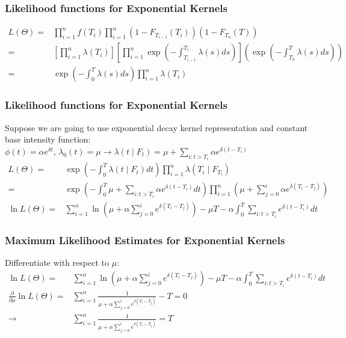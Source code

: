 \documentclass{beamer}
\begin{document}
\begin{frame}
\frametitle{Likelihood functions for Exponential Kernels}
\begin{equation*}
\begin{split}
L(\Theta) = &\prod_{i=1}^n f(T_{i}) \prod_{i=1}^n (1-F_{T_{i-1}}(T_i)) (1-F_{T_{n}}(T))\\
= &[\prod_{i=1}^n \lambda(T_{i})] [\prod_{i=1}^n \exp(-\int_{T_{i-1}}^{T_i} \lambda(s) ds)] (\exp(-\int_{T_{n}}^{T} \lambda(s) ds))\\
= &\exp(-\int_{0}^{T} \lambda(s) ds) \prod_{i=1}^n \lambda(T_{i})
\end{split}
\end{equation*}
\end{frame}

\begin{frame}
\frametitle{Likelihood functions for Exponential Kernels}
Suppose we are going to use exponential decay kernel representation and constant base intensity function:\\
$\phi(t) = \alpha e^{\delta t}$, $\lambda_0(t) = \mu \to \lambda(t \mid F_{t}) = \mu + \sum_{i: t>T_i} \alpha e^{\delta (t - T_{i})}$
\begin{equation*}
\begin{split}
L(\Theta) = &\exp(-\int_{0}^{T} \lambda(t \mid F_t) dt) \prod_{i=1}^n \lambda(T_i \mid F_{T_{i}})\\
= &\exp(-\int_{0}^{T}  \mu + \sum_{i: t>T_i} \alpha e^{\delta (t - T_i)} dt) \prod_{i=1}^n (\mu + \sum_{j=0}^i \alpha e^{\delta (T_i - T_j)})\\[5mm]
\ln L(\Theta) = & \sum_{i=1}^n \ln (\mu + \alpha \sum_{j=0}^i  e^{\delta (T_i - T_j)}) - \mu T - \alpha \int_{0}^{T}  \sum_{i: t>T_i} e^{\delta (t - T_i)} dt 
\end{split}
\end{equation*}
\end{frame}

\begin{frame}
\frametitle{Maximum Likelihood Estimates for Exponential Kernels}
Differentiate with respect to $\mu$:
\begin{equation*}
\begin{split}
\ln L(\Theta) = & \sum_{i=1}^n \ln (\mu + \alpha \sum_{j=0}^i  e^{\delta (T_i - T_j)}) - \mu T - \alpha \int_{0}^{T}  \sum_{i: t>T_i} e^{\delta (t - T_i)} dt \\
\frac{\partial}{\partial \mu} \ln L(\Theta) =& \sum_{i=1}^n \frac{1}{\mu + \alpha \sum_{j=0}^i e^{\delta (T_i - T_j)}} - T = 0\\
\to &\sum_{i=1}^n \frac{1}{\mu + \alpha \sum_{j=0}^i e^{\delta (T_i - T_j)}} = T
\end{split}
\end{equation*}
\end{frame}
\end{document}
